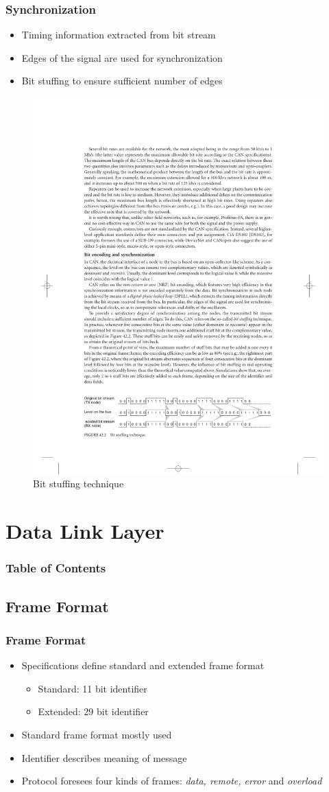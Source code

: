 \documentclass{beamer}
\begin{document}
\begin{frame}
	\frametitle{Synchronization}
	\begin{itemize}
		\item Timing information extracted from bit stream
		\item Edges of the signal are used for synchronization
		\item Bit stuffing to ensure sufficient number of edges
	\end{itemize}
		\begin{figure}
	\includegraphics[width=.6\textwidth]{bitstuffing.pdf} 
\caption{Bit stuffing technique \cite{principles}}
\end{figure}
\end{frame}

\section{Data Link Layer}
\begin{frame}
  \frametitle{Table of Contents}
  \tableofcontents[currentsection]
\end{frame}
\subsection{Frame Format}
\begin{frame}
	\frametitle{Frame Format}
	\begin{itemize}
		\item Specifications define standard and extended frame format
		\begin{itemize}
			\item Standard: 11 bit identifier
			\item Extended: 29 bit identifier
		\end{itemize}
		\item Standard frame format mostly used
		\item Identifier describes meaning of message
		\item Protocol foresees four kinds of frames: \emph{data, remote, error} and \emph{overload}
	\end{itemize}
\end{frame}
\end{document}
